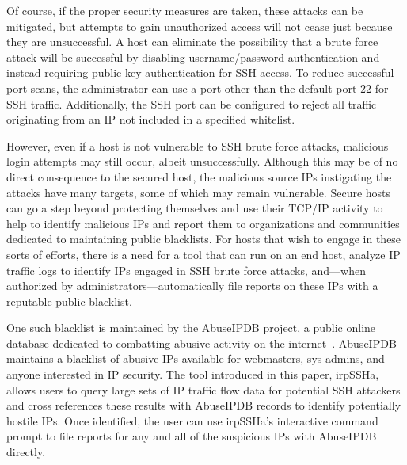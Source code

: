 Of course, if the proper security measures are taken, these attacks can be mitigated, but attempts to gain unauthorized access will not cease just because they are unsuccessful. A host can eliminate the possibility that a brute force attack will be successful by disabling username/password authentication and instead requiring public-key authentication for SSH access. To reduce successful port scans, the administrator can use a port other than the default port 22 for SSH traffic. Additionally, the SSH port can be configured to reject all traffic originating from an IP not included in a specified whitelist. 

However, even if a host is not vulnerable to SSH brute force attacks, malicious login attempts may still occur, albeit unsuccessfully. Although this may be of no direct consequence to the secured host, the malicious source IPs instigating the attacks have many targets, some of which may remain vulnerable. Secure hosts can go a step beyond protecting themselves and use their TCP/IP activity to help to identify malicious IPs and report them to organizations and communities dedicated to maintaining public blacklists. For hosts that wish to engage in these sorts of efforts, there is a need for a tool that can run on an end host, analyze IP traffic logs to identify IPs engaged in SSH brute force attacks, and---when authorized by administrators---automatically file reports on these IPs with a reputable public blacklist.

One such blacklist is maintained by the AbuseIPDB project, a public online database dedicated to combatting abusive activity on the internet~\cite{abuse}. AbuseIPDB maintains a blacklist of abusive IPs available for webmasters, sys admins, and anyone interested in IP security. The tool introduced in this paper, irpSSHa, allows users to query large sets of IP traffic flow data for potential SSH attackers and cross references these results with AbuseIPDB records to identify potentially hostile IPs. Once identified, the user can use irpSSHa's interactive command prompt to file reports for any and all of the suspicious IPs with AbuseIPDB directly.
\label{sec:intro}

